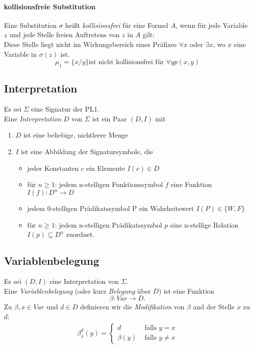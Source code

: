 \documentclass{article}
\begin{document}
\paragraph{kollisionsfreie Substitution}
Eine Substitution $\sigma$ hei{\ss}t \textit{kollisionsfrei} f\"ur eine Formel $A$,
wenn f\"ur jede Variable $z$ und jede Stelle freien Auftretens von $z$ in $A$ gilt: \\
Diese Stelle liegt nicht im Wirkungsbereich eines Pr\"afixes $\forall x$ oder
$\exists x$, wo $x$ eine Variable in $\sigma(z)$ ist.
\[ \mu_1 = \{x/y\} \text{ist nicht kollisionsfrei f\"ur }
\forall y p(x, y) \]

\subsection{Interpretation}
Es sei $\Sigma$ eine Signatur der PL1. \\
Eine \textit{Interpretation} $D$ von $\Sigma$ ist ein Paar $(D, I)$ mit
\begin{enumerate}
    \item $D$ ist eine beliebige, nichtleere Menge
    \item $I$ ist eine Abbildung der Signatursymbole, die
        \begin{itemize}
            \item jeder Konstanten $c$ ein Elemente $I(c) \in D$
            \item f\"ur $n \geq 1$: jedem n-stelligen Funktionssymbol $f$
                eine Funktion $I(f): D^n \rightarrow D$
            \item jedem 0-stelligen Pr\"adikatssymbol P ein Wahrheitswert
                $I(P) \in \{W, F\}$
            \item f\"ur $n \geq 1$: jedem n-stelligen Pr\"adikatssymbol
                $p$ eine n-stellige Relation $I(p) \subseteq D^n$ zuordnet.
        \end{itemize}
\end{enumerate}

\subsection{Variablenbelegung}
Es sei $(D, I)$ eine Interpretation von $\Sigma$. \\
Eine \textit{Variablenbelegung} (oder kurz \textit{Belegung} \"uber $D$)
ist eine Funktion
\[ \beta: Var \rightarrow D. \]
Zu $\beta, x \in Var$ und $d \in D$ definieren wir die \textit{Modifikation} von $\beta$ and der Stelle $x$ zu $d$:
\begin{align*}
    \beta_x^d(y) = \begin{cases}
        d &\text{ falls } y = x \\
        \beta(y) &\text{ falls } y \neq x
    \end{cases}
\end{align*}
\end{document}
